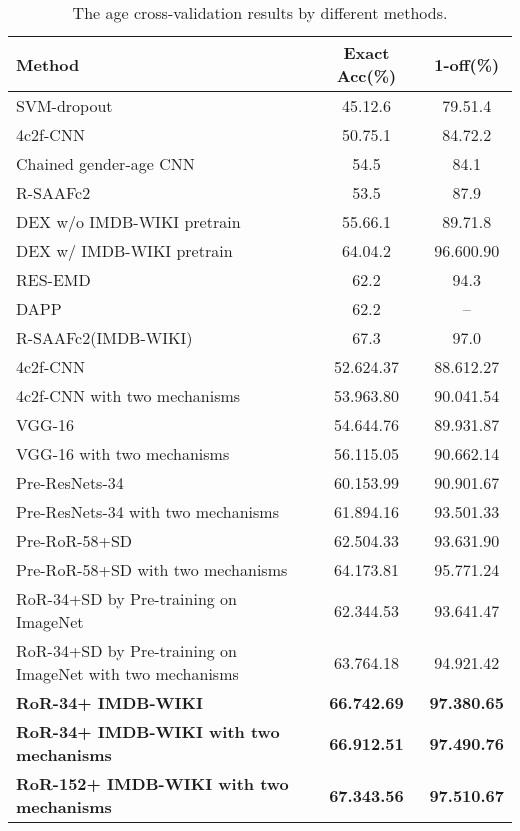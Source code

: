 \documentclass[journal]{IEEEtran}
\begin{document}
\begin{table}[h]
\caption{The age cross-validation results by different methods.}
\centering
\begin{tabular}{|p{3.1cm}|c|c|}
\hline
Method &Exact Acc(\%)  &1-off(\%)  \\ 
\hline\hline
SVM-dropout~\cite{AgeSVMdrop}       &45.12.6 &79.51.4    \\
\hline
4c2f-CNN~\cite{Agegenderbycnn}      &50.75.1 &84.72.2   \\
\hline
Chained gender-age CNN~\cite{AgeEkmekji}    &54.5     &84.1           \\
\hline
R-SAAFc2~\cite{AgeSAAF}             &53.5     &87.9   \\
\hline
DEX w/o IMDB-WIKI pretrain~\cite{Dex}   &55.66.1 &89.71.8   \\
\hline
DEX w/ IMDB-WIKI pretrain~\cite{Dex}    &64.04.2 &96.600.90   \\
\hline
RES-EMD~\cite{EMD2}    &62.2   &94.3   \\
\hline
DAPP~\cite{DAPP}    &62.2 &--   \\
\hline
R-SAAFc2(IMDB-WIKI)~\cite{SAAF+IMDB}    &67.3   &97.0   \\
\hline
\hline
4c2f-CNN      &52.624.37 &88.612.27 \\
\hline
4c2f-CNN with two mechanisms    &53.963.80 &90.041.54 \\
\hline
VGG-16        &54.644.76 &89.931.87 \\
\hline
VGG-16 with two mechanisms    &56.115.05 &90.662.14 \\
\hline
Pre-ResNets-34      &60.153.99 &90.901.67 \\
\hline
Pre-ResNets-34 with two mechanisms  &61.894.16 &93.501.33 \\
\hline
Pre-RoR-58+SD       &62.504.33 &93.631.90 \\
\hline
Pre-RoR-58+SD with two mechanisms   &64.173.81 &95.771.24 \\
\hline
RoR-34+SD by Pre-training on ImageNet     &62.344.53               &93.641.47  \\
\hline
RoR-34+SD by Pre-training on ImageNet with two mechanisms  &63.764.18 &94.921.42 \\
\hline
\textbf{RoR-34+ IMDB-WIKI}   &\textbf{66.742.69} &\textbf{97.380.65} \\
\hline
\textbf{RoR-34+ IMDB-WIKI with two mechanisms}   &\textbf{66.912.51} &\textbf{97.490.76} \\
\hline
\textbf{RoR-152+ IMDB-WIKI with two mechanisms}   &\textbf{67.343.56} &\textbf{97.510.67} \\
\hline
\end{tabular}

\label{tab:tab12}
\end{table}
\end{document}
